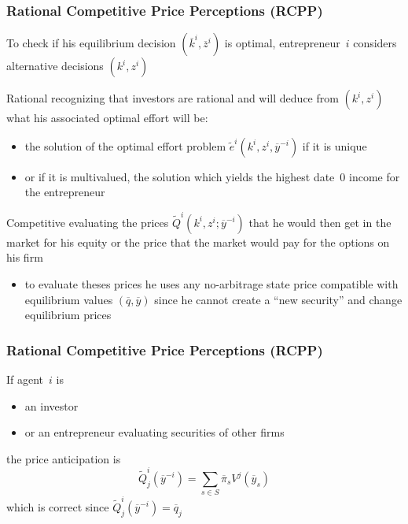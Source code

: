 \documentclass[blue]{beamer}
\theoremstyle{definition}
\theoremstyle{example}
\begin{document}

\begin{frame}\frametitle{Rational Competitive Price Perceptions (RCPP)}

To check if his equilibrium decision $(\overline{k}^i,\overline{z}^i)$ is optimal, entrepreneur~$i$ considers alternative decisions $(k^i,z^i)$
\begin{small}
\begin{block}{Rational}
recognizing that investors are rational and will deduce from $(k^i,z^i)$ what his associated optimal effort will be:
    \begin{itemize}
    \item the solution of the optimal effort problem $\widetilde{e}^i(k^i,z^i,\overline{y}^{-i})$ if it is unique
    \item or if it is multivalued, the solution which yields the highest date~$0$ income for the entrepreneur
    \end{itemize}
\end{block}

\begin{block}{Competitive}
evaluating the prices $\widetilde{Q}^i(k^i,z^i;\overline{y}^{-i})$ that he would then get in the market for his equity or the price that the market would pay for the options on his firm
    \begin{itemize}
    \item to evaluate theses prices he uses any no-arbitrage state price compatible with equilibrium values $(\overline{q},\overline{y})$ since he cannot create a ``new security'' and change equilibrium
prices
    \end{itemize}
\end{block}
\end{small}
\end{frame}


\begin{frame}\frametitle{Rational Competitive Price Perceptions (RCPP)}

If agent~$i$ is
\begin{itemize}
\item an investor
\item or an entrepreneur evaluating securities of other firms
\end{itemize}
the price anticipation is
\[
\widetilde{Q}^i_j(\overline{y}^{-i}) = \sum_{s\in S} \overline{\pi}_s V^j(\overline{y}_s)
\]
which is correct since $\widetilde{Q}^i_j(\overline{y}^{-i}) = \overline{q}_j$

\end{frame}
\end{document}
